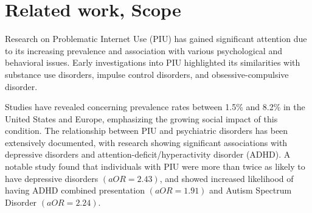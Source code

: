 \documentclass[11pt]{extarticle}
\begin{document}


\section{Related work, Scope} 

    Research on Problematic Internet Use (PIU) has gained significant attention due to its increasing prevalence and association with various psychological and behavioral issues. Early investigations into PIU highlighted its similarities with substance use disorders, impulse control disorders, and obsessive-compulsive disorder.
    
    Studies have revealed concerning prevalence rates between 1.5\% and 8.2\% in the United States and Europe, emphasizing the growing social impact of this condition. 
    The relationship between PIU and psychiatric disorders has been extensively documented, with research showing significant associations with depressive disorders and attention-deficit/hyperactivity disorder (ADHD). 
    A notable study found that individuals with PIU were more than twice as likely to have depressive disorders $(aOR = 2.43)$, and showed increased likelihood of having ADHD combined presentation $(aOR = 1.91)$ and Autism Spectrum Disorder $(aOR = 2.24)$.
    
\end{document}
